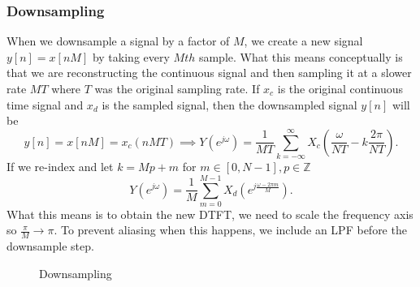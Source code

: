 \subsubsection{Downsampling}
When we downsample a signal by a factor of $M$, we create a new signal $y[n]=x[nM]$ by taking every $Mth$ sample. 
What this means conceptually is that we are reconstructing the continuous signal and then sampling it at a slower rate $MT$ where $T$ was the original sampling rate. 
If $x_c$ is the original continuous time signal and $x_d$ is the sampled signal, then the downsampled signal $y[n]$ will be
\[
  y[n]=x[nM]=x_c(nMT)\implies Y(e^{j\omega}) =\frac{1}{MT}\sum_{k=-\infty}^{\infty}X_c\left(\frac{\omega}{NT}-k\frac{2\pi}{NT}\right).
\]
If we re-index and let $k=Mp+m$ for $m\in [0, N-1],p\in \mathbb{Z}$
\[
  Y(e^{j\omega})=\frac{1}{M}\sum_{m=0}^{M-1}X_d(e^{j\frac{\omega-2\pi m}{M}}).
\]
What this means is to obtain the new DTFT, we need to scale the frequency axis so $\frac{\pi}{M}\rightarrow \pi$.
To prevent aliasing when this happens, we include an LPF before the downsample step.
\begin{gitbook-image}
\begin{figure}[H]
  \centering
  \caption{Downsampling}
  \label{fig:downsample}
\end{figure}
\end{gitbook-image}

